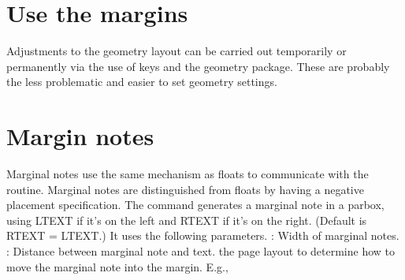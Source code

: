 
\section{Use the margins}

Adjustments to the geometry layout can be carried out temporarily or permanently via the use of keys and
the geometry package. These are probably the less problematic and easier to set geometry settings.

\section{Margin notes}

Marginal notes use the same mechanism as
floats to communicate with the  routine. Marginal notes are distinguished from
floats by having a negative placement specification. The command
 generates a marginal note in a parbox,
using LTEXT if it's on the left and RTEXT if it's on the right.
(Default is RTEXT = LTEXT.) It uses the following parameters.
: Width of marginal notes.
: Distance between marginal note and text.
the page layout to determine how to move the marginal
note into the margin. E.g.,


